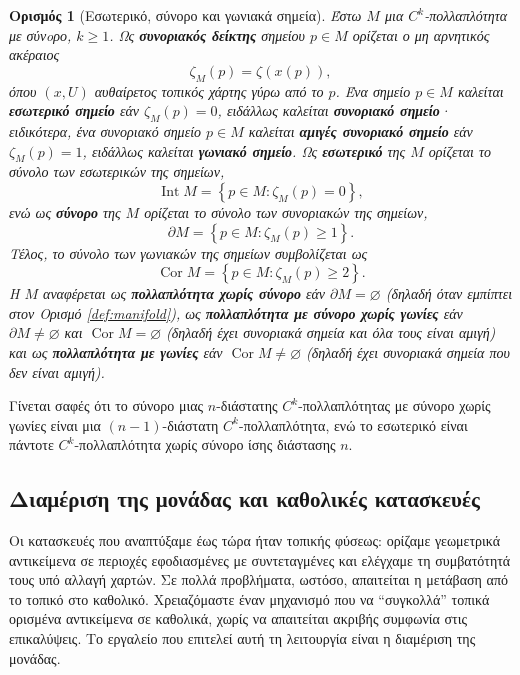 \documentclass[11pt,a4paper,twoside,openright]{book}
\newtheorem{definition}[lemma]{Ορισμός}
\begin{document}
\begin{definition}[Εσωτερικό, σύνορο και γωνιακά σημεία]\label{def:interior-boundary-corner}
Έστω $M$ μια $C^k$-πολλαπλότητα με σύνoρο, $k \ge 1$.
Ως \textbf{συνοριακός δείκτης} σημείου $p \in M$
ορίζεται ο μη αρνητικός ακέραιος
\begin{equation*}\label{eq:boundary-index-on-M}
\zeta_M(p) = \zeta(x(p)),
\end{equation*}
όπου $(x, U)$ αυθαίρετος τοπικός χάρτης γύρω από το $p$.
Ένα σημείο $p \in M$ καλείται \textbf{εσωτερικό σημείο} εάν $\zeta_M(p) = 0$, ειδάλλως καλείται \textbf{συνοριακό σημείο}·
ειδικότερα, ένα συνοριακό σημείο $p \in M$ καλείται \textbf{αμιγές συνοριακό σημείο} εάν $\zeta_M(p) = 1$, ειδάλλως καλείται \textbf{γωνιακό σημείο}. Ως \textbf{εσωτερικό} της $M$ ορίζεται το σύνολο των εσωτερικών της σημείων,
\begin{equation*}
\operatorname{Int} M = \left\{ p \in M : \zeta_M(p) = 0 \right\},
\end{equation*}
ενώ ως \textbf{σύνορο} της $M$ ορίζεται το σύνολο των συνοριακών της σημείων,
\begin{equation*}
\partial M = \left\{ p \in M : \zeta_M(p) \ge 1 \right\}.
\end{equation*}
Tέλος, το σύνολο των γωνιακών της σημείων συμβολίζεται ως
\begin{equation*}
\operatorname{Cor} M = \left\{ p \in M : \zeta_M(p) \ge 2 \right\}.
\end{equation*}
H $Μ$ αναφέρεται ως \textbf{πολλαπλότητα χωρίς σύνορο} εάν $\partial M = \varnothing$ (δηλαδή όταν εμπίπτει στον Ορισμό \ref{def:manifold}), ως \textbf{πολλαπλότητα με σύνορο χωρίς γωνίες} εάν $\partial M \neq \varnothing$ και $\operatorname{Cor} M = \varnothing$ (δηλαδή έχει συνοριακά σημεία και όλα τους είναι αμιγή) και ως \textbf{πολλαπλότητα με γωνίες} εάν $\operatorname{Cor} M \neq \varnothing$ (δηλαδή έχει συνοριακά σημεία που δεν είναι αμιγή).
\end{definition}
\noindent
Γίνεται σαφές ότι
το σύνορο μιας $n$-διάστατης $C^k$-πολλαπλότητας με σύνορο χωρίς γωνίες είναι μια $(n-1)$-διάστατη $C^k$-πολλαπλότητα, ενώ το εσωτερικό είναι πάντοτε $C^k$-πολλαπλότητα χωρίς σύνορο ίσης διάστασης $n$.

\subsection{Διαμέριση της μονάδας και καθολικές κατασκευές}
	\label{sec:partition-of-unity}

Οι κατασκευές που αναπτύξαμε έως τώρα ήταν τοπικής φύσεως: ορίζαμε γεωμετρικά αντικείμενα σε περιοχές εφοδιασμένες με συντεταγμένες και ελέγχαμε τη συμβατότητά τους υπό αλλαγή χαρτών. Σε πολλά προβλήματα, ωστόσο, απαιτείται η μετάβαση από το τοπικό στο καθολικό. Χρειαζόμαστε έναν μηχανισμό που να ``συγκολλά'' τοπικά ορισμένα αντικείμενα σε καθολικά, χωρίς να απαιτείται ακριβής συμφωνία στις επικαλύψεις. Το εργαλείο που επιτελεί αυτή τη λειτουργία είναι η διαμέριση της μονάδας.
\end{document}
